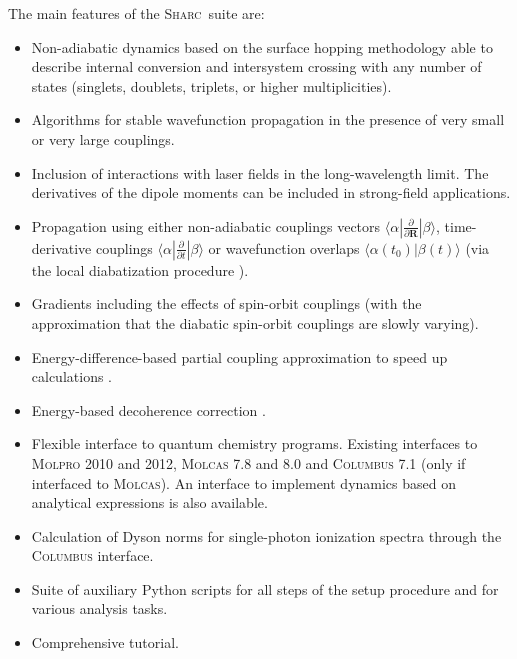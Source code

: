 \documentclass[a4paper,11pt,DIV=15,openany,twoside=false]{scrbook}
\newcommand{\sharc}{\textsc{Sharc}}
\begin{document}
The main features of the \sharc\ suite are:
\begin{itemize}
  \item Non-adiabatic dynamics based on the surface hopping methodology able to describe internal conversion and intersystem crossing with any number of states (singlets, doublets, triplets, or higher multiplicities).
  \item Algorithms for stable wavefunction propagation in the presence of very small or very large couplings.
  \item Inclusion of interactions with laser fields in the long-wavelength limit. The derivatives of the dipole moments can be included in strong-field applications.
  \item Propagation using either non-adiabatic couplings vectors $\langle\alpha|\frac{\partial}{\partial \mathbf{R}}|\beta\rangle$, time-derivative couplings $\langle\alpha|\frac{\partial}{\partial t}|\beta\rangle$ or wavefunction overlaps $\langle\alpha(t_0)|\beta(t)\rangle$ (via the local diabatization procedure \cite{Granucci2007JCP}).
  \item Gradients including the effects of spin-orbit couplings (with the approximation that the diabatic spin-orbit couplings are slowly varying).
  \item Energy-difference-based partial coupling approximation to speed up calculations \cite{Pittner2009CP}.
  \item Energy-based decoherence correction \cite{Granucci2007JCP}.
  \item Flexible interface to quantum chemistry programs. Existing interfaces to \textsc{Molpro} 2010 and 2012, \textsc{Molcas} 7.8 and 8.0 and \textsc{Columbus 7.1} (only if interfaced to \textsc{Molcas}). An interface to implement dynamics based on analytical expressions is also available.
  \item Calculation of Dyson norms for single-photon ionization spectra through the \textsc{Columbus} interface.
  \item Suite of auxiliary Python scripts for all steps of the setup procedure and for various analysis tasks.
  \item Comprehensive tutorial.
\end{itemize}

\end{document}
